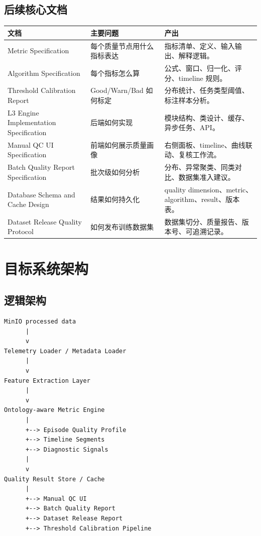 \documentclass[UTF8,zihao=-4]{ctexart}
\begin{document}
\subsection{后续核心文档}

\begin{longtable}{L{4.2cm} L{4.2cm} L{5.8cm}}
\toprule
文档 & 主要问题 & 产出 \\
\midrule
Metric Specification & 每个质量节点用什么指标表达 & 指标清单、定义、输入输出、解释逻辑。 \\
Algorithm Specification & 每个指标怎么算 & 公式、窗口、归一化、评分、timeline 规则。 \\
Threshold Calibration Report & Good/Warn/Bad 如何标定 & 分布统计、任务类型阈值、标注样本分析。 \\
L3 Engine Implementation Specification & 后端如何实现 & 模块结构、类设计、缓存、异步任务、API。 \\
Manual QC UI Specification & 前端如何展示质量画像 & 右侧面板、timeline、曲线联动、复核工作流。 \\
Batch Quality Report Specification & 批次级如何分析 & 分布、异常聚类、同类对比、数据集准入建议。 \\
Database Schema and Cache Design & 结果如何持久化 & quality dimension、metric、algorithm、result、版本表。 \\
Dataset Release Quality Protocol & 如何发布训练数据集 & 数据集切分、质量报告、版本号、可追溯记录。 \\
\bottomrule
\end{longtable}

\section{目标系统架构}

\subsection{逻辑架构}

\begin{verbatim}
MinIO processed data
      |
      v
Telemetry Loader / Metadata Loader
      |
      v
Feature Extraction Layer
      |
      v
Ontology-aware Metric Engine
      |
      +--> Episode Quality Profile
      +--> Timeline Segments
      +--> Diagnostic Signals
      |
      v
Quality Result Store / Cache
      |
      +--> Manual QC UI
      +--> Batch Quality Report
      +--> Dataset Release Report
      +--> Threshold Calibration Pipeline
\end{verbatim}
\end{document}

